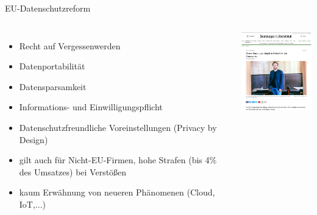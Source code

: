 \documentclass[12pt, xcolor={svgnames,table}]{beamer}
\begin{document}
\begin{frame}{EU-Datenschutzreform}
  \begin{columns}
    \column{5.5cm}
    \footnotesize

    \begin{itemize}
      \item Recht auf Vergessenwerden
      \item Datenportabilität
      \item Datensparsamkeit
      \item Informations- und Einwilligungspflicht
      \item Datenschutzfreundliche Voreinstellungen (Privacy by Design)
      \item gilt auch für Nicht-EU-Firmen, hohe Strafen (bis 4\% des Umsatzes) bei Verstößen
      \item kaum Erwähnung von neueren Phänomenen (Cloud, IoT,...)
    \end{itemize}

    \column{5cm}

    \begin{center}
      \includegraphics[width=4.5cm]{img/datenschutz-eu.png}
    \par\end{center}
  \end{columns}
\end{frame}
\end{document}

